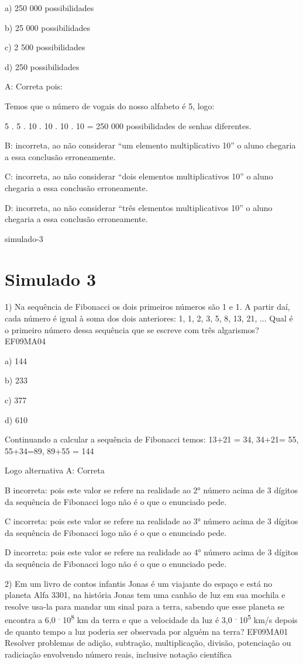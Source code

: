 {a) 250 000 possibilidades

b) 25 000 possibilidades

c) 2 500 possibilidades

d) 250 possibilidades

A: Correta pois:

Temos que o número de vogais do nosso alfabeto é 5, logo:

5 . 5 . 10 . 10 . 10 . 10 = 250 000 possibilidades de senhas diferentes.

B: incorreta, ao não considerar ``um elemento multiplicativo 10'' o
aluno chegaria a essa conclusão erroneamente.

C: incorreta, ao não considerar ``dois elementos multiplicativos 10'' o
aluno chegaria a essa conclusão erroneamente.

D: incorreta, ao não considerar ``três elementos multiplicativos 10'' o
aluno chegaria a essa conclusão erroneamente.

simulado-3}{%
\section{Simulado 3}

1) Na sequência de Fibonacci os dois primeiros números são 1 e 1. A
partir daí, cada número é igual à soma dos dois anteriores: 1, 1, 2, 3,
5, 8, 13, 21, ... Qual é o primeiro número dessa sequência que se
escreve com três algarismos? EF09MA04

a) 144

b) 233

c) 377

d) 610

Continuando a calcular a sequência de Fibonacci temos: 13+21 = 34,
34+21= 55, 55+34=89, 89+55 = 144

Logo alternativa A: Correta

B incorreta: pois este valor se refere na realidade ao 2° número acima
de 3 dígitos da sequência de Fibonacci logo não é o que o enunciado
pede.

C incorreta: pois este valor se refere na realidade ao 3° número acima
de 3 dígitos da sequência de Fibonacci logo não é o que o enunciado
pede.

D incorreta: pois este valor se refere na realidade ao 4° número acima
de 3 dígitos da sequência de Fibonacci logo não é o que o enunciado
pede.

2) Em um livro de contos infantis Jonas é um viajante do espaço e está
no planeta Alfa 3301, na história Jonas tem uma canhão de luz em sua
mochila e resolve usa-la para mandar um sinal para a terra, sabendo que
esse planeta se encontra a 6,0 \textsuperscript{.} 10\textsuperscript{8}
km da terra e que a velocidade da luz é 3,0 \textsuperscript{.}
10\textsuperscript{5} km/s depois de quanto tempo a luz poderia ser
observada por alguém na terra? EF09MA01 Resolver problemas de adição,
subtração, multiplicação, divisão, potenciação ou radiciação envolvendo
número reais, inclusive notação científica

}
